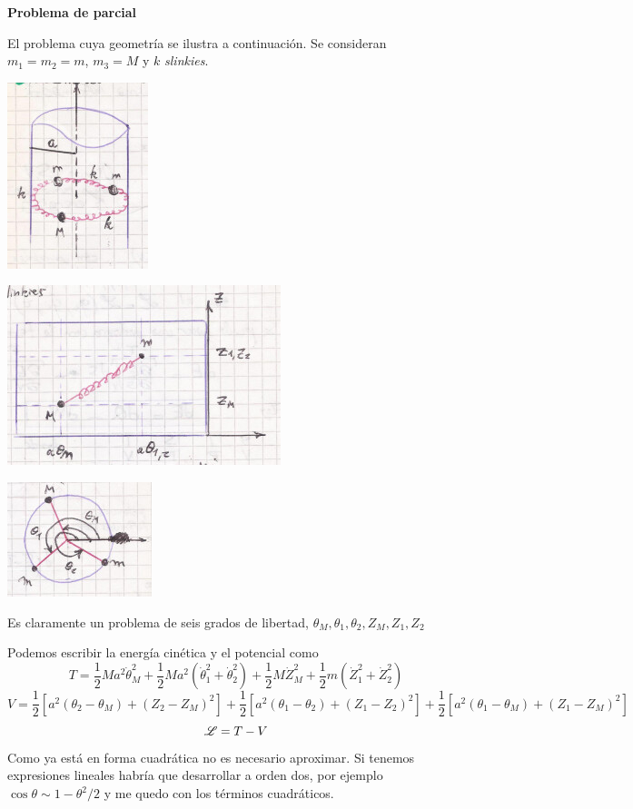 \documentclass[10pt,oneside]{CBFT_book}
\begin{document}
\begin{ejemplo}{\bf Problema de parcial}

El problema cuya geometría se ilustra a continuación. Se consideran $m_1 = m_2 = m$, $m_3 = M$ y  $k$ {\it slinkies}.

\includegraphics[scale=0.5]{images/fig_mc_problema_parcial_osc_0.jpg}
 
\includegraphics[scale=0.5]{images/fig_mc_problema_parcial_osc_1.jpg}

\includegraphics[scale=0.5]{images/fig_mc_problema_parcial_osc_2.jpg}

Es claramente un problema de seis grados de libertad, $\theta_M, \theta_1, \theta_2, Z_M, Z_1, Z_2$ 

Podemos escribir la energía cinética y el potencial como 
\[
	T = \frac{1}{2} M a^2 \dot{\theta}_M^2 + \frac{1}{2} M a^2 (\dot{\theta}_1^2 + \dot{\theta}_2^2 ) +
	\frac{1}{2} M \dot{Z}_M^2 + \frac{1}{2} m ( \dot{Z}_1^2 + \dot{Z}_2^2 )
\]
\[
	V = \frac{1}{2} \left[ a^2 ( \theta_2 - \theta_M ) + ( Z_2 - Z_M )^2 \right] +
	\frac{1}{2} \left[  a^2 ( \theta_1 - \theta_2 ) + ( Z_1 - Z_2 )^2 \right] +
	\frac{1}{2} \left[ a^2 ( \theta_1 - \theta_M ) + ( Z_1- Z_M )^2 \right] 
\]
\[
	\mathscr{L} = T - V
\]
Como ya está en forma cuadrática no es necesario aproximar. Si tenemos expresiones lineales habría que desarrollar
a orden dos, por ejemplo $ \cos \theta \sim 1 - \theta^2/2 $ y me quedo con los términos cuadráticos.


\end{ejemplo}
\end{document}
